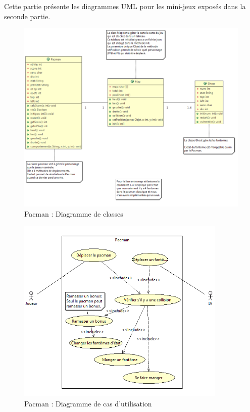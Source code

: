 Cette partie présente les diagrammes UML pour les mini-jeux exposés dans la seconde partie.

\listoffigures

\clearpage

\begin{figure}[h]
 \centering
 \includegraphics[width=\textwidth]{../umls/UML_images/Pacman/class} \hfill
 \caption{Pacman : Diagramme de classes}
\end{figure}

\begin{figure}[h]
 \centering
 \includegraphics[width=10cm]{../umls/UML_images/Pacman/utilisation}
 \caption{Pacman : Diagramme de cas d'utilisation}
\end{figure}

